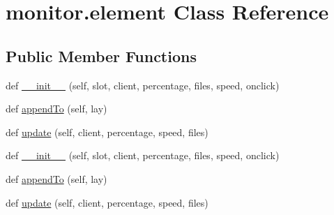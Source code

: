 \hypertarget{classmonitor_1_1element}{}\section{monitor.\+element Class Reference}
\label{classmonitor_1_1element}
\subsection*{Public Member Functions}
\begin{DoxyCompactItemize}
\item 
def \hyperlink{classmonitor_1_1element_a2850c0af0e60931936b830a926142117}{\+\_\+\+\_\+init\+\_\+\+\_\+} (self, slot, client, percentage, files, speed, onclick)
\item 
def \hyperlink{classmonitor_1_1element_a4a4a31dae1c21c96d2868eb9ccac98fe}{append\+To} (self, lay)
\item 
def \hyperlink{classmonitor_1_1element_a7d906301ba087ebbc6bc738344a891ce}{update} (self, client, percentage, speed, files)
\item 
def \hyperlink{classmonitor_1_1element_a2850c0af0e60931936b830a926142117}{\+\_\+\+\_\+init\+\_\+\+\_\+} (self, slot, client, percentage, files, speed, onclick)
\item 
def \hyperlink{classmonitor_1_1element_a4a4a31dae1c21c96d2868eb9ccac98fe}{append\+To} (self, lay)
\item 
def \hyperlink{classmonitor_1_1element_a7d906301ba087ebbc6bc738344a891ce}{update} (self, client, percentage, speed, files)
\end{DoxyCompactItemize}
